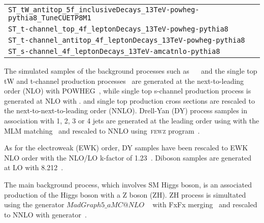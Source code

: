 \begin{table}[htbp]
\begin{center}
\begin{tabular}{|c|}
      \multicolumn{5}{|l|}{\texttt{ST\_tW\_antitop\_5f\_inclusiveDecays\_13TeV-powheg-pythia8\_TuneCUETP8M1}} \\
      \multicolumn{5}{|l|}{\texttt{ST\_t-channel\_top\_4f\_leptonDecays\_13TeV-powheg-pythia8}} \\
      \multicolumn{5}{|l|}{\texttt{ST\_t-channel\_antitop\_4f\_leptonDecays\_13TeV-powheg-pythia8}} \\
      \multicolumn{5}{|l|}{\texttt{ST\_s-channel\_4f\_leptonDecays\_13TeV-amcatnlo-pythia8}} \\
\hline%

    \end{tabular}
  \end{center}
\end{table}



The simulated samples of the background processes such as 
~\ttbar~\cite{Frixione:2007nw} and the single top tW and t-channel
production processes~\cite{Frederix:2012dh} are generated at the
next-to-leading order (NLO) with POWHEG~\cite{Alioli:2009je}, while
single top s-channel production process is generated at NLO with
\MADGRAPH. \ttbar and single top production cross sections are
rescaled to the next-to-next-to-leading order (NNLO). 
Drell-Yan (DY)
process samples in association with 1, 2, 3 or 4 jets are generated
at the leading order using \MADGRAPH with the MLM
matching~\cite{Alwall:2007fs} and rescaled to NNLO using~\textsc{fewz}
program~\cite{Gavin:2010az,Li:2012wna,Gavin:2012sy}. 

As for the electroweak (EWK) order, DY samples have been rescaled to EWK NLO order with the NLO/LO k-factor of 1.23~\cite{DYkfactor}. Diboson samples
are generated at LO with {\PYTHIA}8.212~\cite{Sjostrand:2007gs}.

The main background
       process, which involves SM Higgs boson, is an associated
       production of the Higgs boson with a Z boson (ZH).  ZH process
       is simultated using the generator
$MadGraph5\_aMC@NLO$
~\cite{cite_aMC@NLO} with FxFx
merging~\cite{Frederix:2012ps} and
rescaled to NNLO with
{\MCFM} generator~\cite{Campbell:2010ff}.



